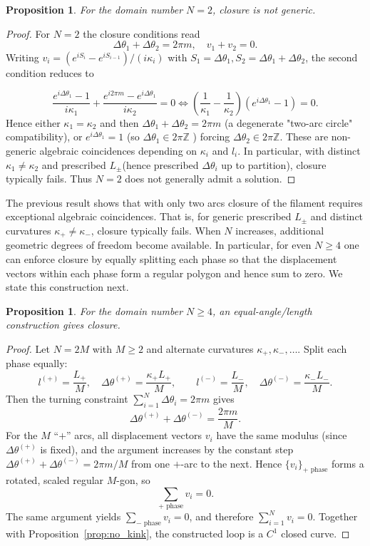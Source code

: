 \documentclass[
aip,
jcp,
reprint, 
floatfix
]{revtex4-1}
\newtheorem{proposition}[theorem]{Proposition}
\begin{document}
\begin{proposition}
    For the domain number $N=2$, closure is not generic.
\end{proposition}
\begin{proof}
    For $N=2$ the closure conditions read
$$
\Delta \theta_1+\Delta \theta_2=2 \pi m, \quad v_1+v_2=0 .
$$
Writing $v_i=\left(e^{i S_i}-e^{i S_{i-1}}\right) /\left(i \kappa_i\right)$ with $S_1=\Delta \theta_1, S_2=\Delta \theta_1+\Delta \theta_2$, the second condition reduces to

$$
\frac{e^{i \Delta \theta_1}-1}{i \kappa_1}+\frac{e^{i 2 \pi m}-e^{i \Delta \theta_1}}{i \kappa_2}=0 \Longleftrightarrow\left(\frac{1}{\kappa_1}-\frac{1}{\kappa_2}\right)\left(e^{i \Delta \theta_1}-1\right)=0 .
$$
Hence either $\kappa_1=\kappa_2$ and then $\Delta \theta_1+\Delta \theta_2=2 \pi m$ (a degenerate "two-arc circle" compatibility), or $e^{i \Delta \theta_1}=1$ (so $\Delta \theta_1 \in 2 \pi \mathbb{Z}$ ) forcing $\Delta \theta_2 \in 2 \pi \mathbb{Z}$. These are non-generic algebraic coincidences depending on $\kappa_i$ and $l_i$. In particular, with distinct $\kappa_1 \neq \kappa_2$ and prescribed $L_{ \pm}$(hence prescribed $\Delta \theta_i$ up to partition), closure typically fails. Thus $N=2$ does not generally admit a solution.
\end{proof}
The previous result shows that with only two arcs closure of the filament requires exceptional algebraic coincidences. That is, for generic prescribed $L_{ \pm}$ and distinct curvatures $\kappa_{+} \neq \kappa_{-}$, closure typically fails. When $N$ increases, additional geometric degrees of freedom become available. In particular, for even $N \geq 4$ one can enforce closure by equally splitting each phase so that the displacement vectors within each phase form a regular polygon and hence sum to zero. We state this construction next.

\begin{proposition}
    For the domain number $N \ge 4$, an equal-angle/length construction gives closure.  
\end{proposition}
\begin{proof}
Let $N=2M$ with $M\ge2$ and alternate curvatures $\kappa_+,\kappa_-,\dots$.
Split each phase equally:
\[
l^{(+)}=\frac{L_+}{M},\quad \Delta\theta^{(+)}=\frac{\kappa_+L_+}{M},\qquad
l^{(-)}=\frac{L_-}{M},\quad \Delta\theta^{(-)}=\frac{\kappa_-L_-}{M}.
\]
Then the turning constraint $\sum_{i=1}^N\Delta\theta_i=2\pi m$ gives
\[
\Delta\theta^{(+)}+\Delta\theta^{(-)}=\frac{2\pi m}{M}.
\]
For the $M$ ``$+$'' arcs, all displacement vectors $v_i$ have the same modulus (since $\Delta\theta^{(+)}$ is fixed),
and the argument increases by the constant step $\Delta\theta^{(+)}+\Delta\theta^{(-)}=2\pi m/M$ from one $+$-arc to the next.
Hence $\{v_i\}_{+\text{ phase}}$ forms a rotated, scaled regular $M$-gon, so
\[
\sum_{+\text{ phase}} v_i=0.
\]
The same argument yields $\sum_{-\text{ phase}} v_i=0$, and therefore $\sum_{i=1}^N v_i=0$.
Together with Proposition~\ref{prop:no_kink}, the constructed loop is a $C^1$ closed curve.
\end{proof}
\end{document}
